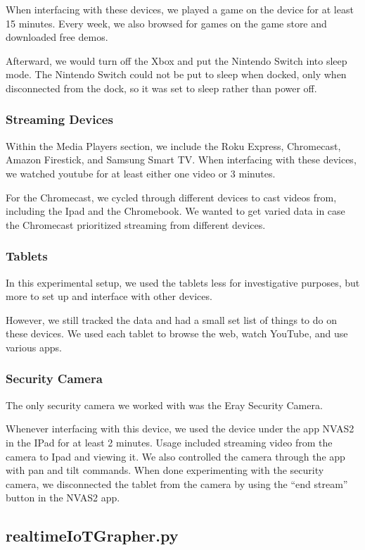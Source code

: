 When interfacing with these devices, we played a game on the device for at least 15 minutes. Every week, we also browsed for games on the game store and downloaded free demos.

Afterward, we would turn off the Xbox and put the Nintendo Switch into sleep mode. The Nintendo Switch could not be put to sleep when docked, only when disconnected from the dock, so it was set to sleep rather than power off.

\subsubsection{Streaming Devices}

Within the Media Players section, we include the Roku Express, Chromecast, Amazon Firestick, and Samsung Smart TV. When interfacing with these devices, we watched youtube for at least either one video or 3 minutes.

For the Chromecast, we cycled through different devices to cast videos from, including the Ipad and the Chromebook. We wanted to get varied data in case the Chromecast prioritized streaming from different devices.

\subsubsection{Tablets}
In this experimental setup, we used the tablets less for investigative purposes, but more to set up and interface with other devices.

However, we still tracked the data and had a small set list of things to do on these devices. We used each tablet to browse the web, watch YouTube, and use various apps.

\subsubsection{Security Camera}

The only security camera we worked with was the Eray Security Camera.

Whenever interfacing with this device, we used the device under the app NVAS2 in the IPad for at least 2 minutes. Usage included streaming video from the camera to Ipad and viewing it. We also controlled the camera through the app with pan and tilt commands. When done experimenting with the security camera, we disconnected the tablet from the camera by using the ``end stream'' button in the NVAS2 app.

\subsection{realtimeIoTGrapher.py}
\label{realtimeIoTGrapher.py}

